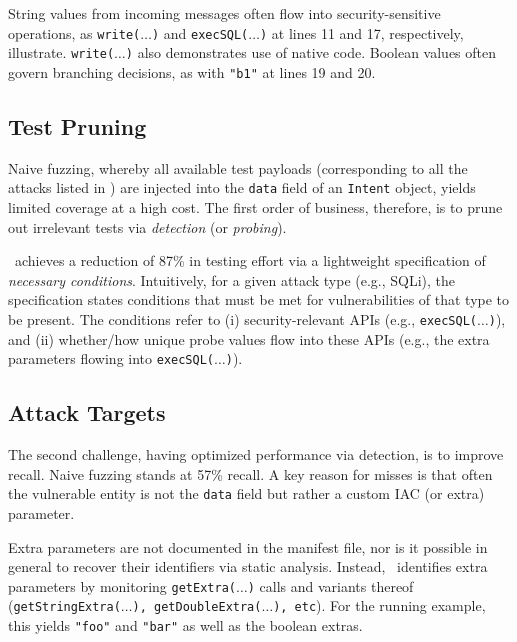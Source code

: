 String values from incoming messages often flow into security-sensitive operations, as {\tt write($\ldots$)} and {\tt execSQL($\ldots$)} at lines 11 and 17, respectively, illustrate. {\tt write($\ldots$)} also demonstrates use of native code.	Boolean values often govern branching decisions, as with {\tt "b1"} at lines 19 and 20.

\subsection{Test Pruning}

Naive fuzzing, whereby all available test payloads (corresponding to all the attacks listed in ) are injected into the {\tt data} field of an {\tt Intent} object, 
yields limited coverage at a high cost. The first order of business, therefore, is to prune out irrelevant tests via \emph{detection} (or \emph{probing}). 

\Tool\ achieves a reduction of 87\% in testing effort via a lightweight specification of \emph{necessary conditions}. Intuitively, for a given attack type (e.g., SQLi), the specification states conditions that must be met for vulnerabilities of that type to be present. The conditions refer to (i) security-relevant APIs (e.g., {\tt execSQL($\ldots$)}), and (ii) whether/how unique probe values flow into these APIs (e.g., the extra parameters flowing into {\tt execSQL($\ldots$)}).

\subsection{Attack Targets}

The second challenge, having optimized performance via detection, is to improve recall. Naive fuzzing stands at 57\% recall. A key reason for misses is that often the vulnerable entity is not the 
{\tt data} field but rather a custom IAC (or extra) parameter.

Extra parameters are not documented in the manifest file, nor is it possible in general to recover their identifiers via static analysis. Instead, \Tool\ identifies extra parameters by monitoring {\tt getExtra($\ldots$)} calls and variants thereof ({\tt getStringExtra($\ldots$), getDoubleExtra($\ldots$), etc}). For the running example, this yields {\tt "foo"} and {\tt "bar"} as well as the boolean extras.
%

